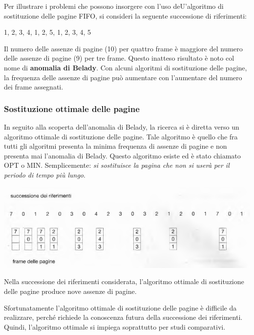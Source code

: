 \documentclass[11pt,a4paper]{article}
\begin{document}
Per illustrare i problemi che possono insorgere con l'uso deU'algoritmo di sostituzione
delle pagine FIFO, si consideri la seguente successione di riferimenti:
\begin{center}
1, 2, 3, 4, 1, 2, 5, 1, 2, 3, 4, 5
\end{center}
Il numero delle assenze di pagine (10) per quattro frame
è maggiore del numero delle assenze di pagine (9) per tre frame. Questo inatteso risultato è
noto col nome di \textbf{anomalia di Belady}. Con alcuni algoritmi di sostitu­zione delle pagine, la frequenza delle assenze di pagine può aumentare con l'aumentare del
numero dei frame assegnati.

\subsubsection{Sostituzione ottimale delle pagine}
In seguito alla scoperta dell'anomalia di Belady, la ricerca si è diretta verso un algoritmo ot­timale di sostituzione delle pagine. Tale algoritmo è quello che fra tutti gli algoritmi pre­senta la minima frequenza di assenze di pagine e non presenta mai l'anomalia di Belady.
Questo algoritmo esiste ed è stato chiamato OPT o MIN. Semplicemente:
\emph{si sostituisce la pagina che non si userà per il periodo di tempo più lungo}.
\begin{center}
  \includegraphics[scale=0.6]{img/0049.png}
\end{center}
Nella successione dei riferimenti considerata, l'algoritmo ottimale di sostituzio­ne delle pagine produce nove assenze di pagine.

Sfortunatamente l'algoritmo ottimale di sostituzione delle pagine è difficile da realiz­zare, perché richiede la conoscenza futura della successione dei riferimenti. Quindi, l'algoritmo ottimale si impiega soprattutto per studi comparativi.
\end{document}
